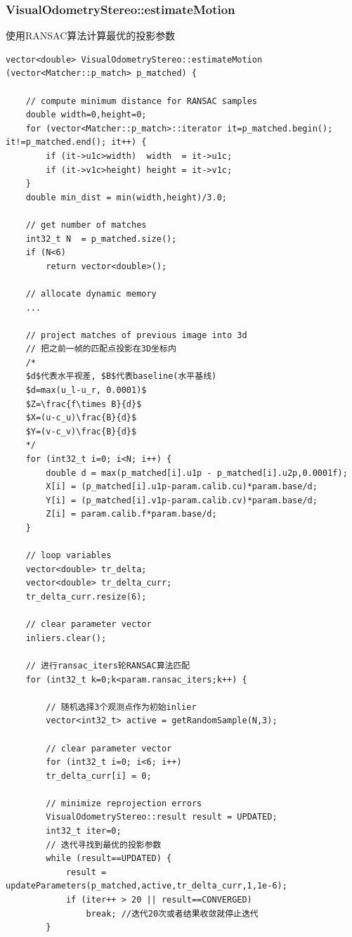 \documentclass[UTF8]{ctexart}
\begin{document}
    \subsubsection{VisualOdometryStereo::estimateMotion}
    使用RANSAC算法计算最优的投影参数
    \begin{verbatim}
vector<double> VisualOdometryStereo::estimateMotion (vector<Matcher::p_match> p_matched) {

    // compute minimum distance for RANSAC samples
    double width=0,height=0;
    for (vector<Matcher::p_match>::iterator it=p_matched.begin(); it!=p_matched.end(); it++) {
        if (it->u1c>width)  width  = it->u1c;
        if (it->v1c>height) height = it->v1c;
    }
    double min_dist = min(width,height)/3.0;
    
    // get number of matches
    int32_t N  = p_matched.size();
    if (N<6)
        return vector<double>();

    // allocate dynamic memory
    ...

    // project matches of previous image into 3d
    // 把之前一帧的匹配点投影在3D坐标内
    /* 
    $d$代表水平视差, $B$代表baseline(水平基线)
    $d=max(u_l-u_r, 0.0001)$
    $Z=\frac{f\times B}{d}$
    $X=(u-c_u)\frac{B}{d}$
    $Y=(v-c_v)\frac{B}{d}$
    */
    for (int32_t i=0; i<N; i++) {
        double d = max(p_matched[i].u1p - p_matched[i].u2p,0.0001f);
        X[i] = (p_matched[i].u1p-param.calib.cu)*param.base/d;
        Y[i] = (p_matched[i].v1p-param.calib.cv)*param.base/d;
        Z[i] = param.calib.f*param.base/d;
    }

    // loop variables
    vector<double> tr_delta;
    vector<double> tr_delta_curr;
    tr_delta_curr.resize(6);
    
    // clear parameter vector
    inliers.clear();

    // 进行ransac_iters轮RANSAC算法匹配
    for (int32_t k=0;k<param.ransac_iters;k++) {

        // 随机选择3个观测点作为初始inlier
        vector<int32_t> active = getRandomSample(N,3);

        // clear parameter vector
        for (int32_t i=0; i<6; i++)
        tr_delta_curr[i] = 0;

        // minimize reprojection errors
        VisualOdometryStereo::result result = UPDATED;
        int32_t iter=0;
        // 迭代寻找到最优的投影参数
        while (result==UPDATED) {
            result = updateParameters(p_matched,active,tr_delta_curr,1,1e-6);
            if (iter++ > 20 || result==CONVERGED)
                break; //迭代20次或者结果收敛就停止迭代
        }


\end{verbatim}
\end{document}
